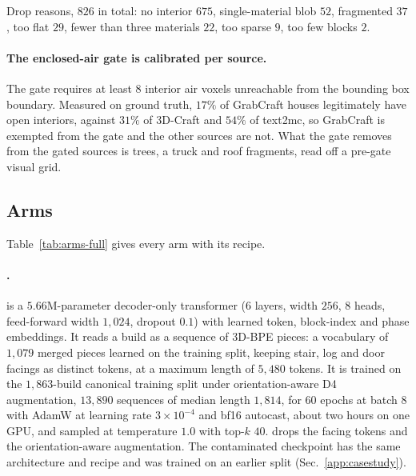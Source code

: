\begin{table}[h]
\centering
\small
\caption{Corpus construction, transcribed from the cache manifest. Per-source
columns are post-gate, post-deduplication counts and sum to \textbf{final}, which
is \emph{pooled} less quality drops less exact duplicates. Material variants, the
same shape in different materials, are \emph{kept}.}
\setlength{\tabcolsep}{3pt}
\end{table}

Drop reasons, $826$ in total: no interior $675$, single-material blob
$52$, fragmented $37$, too flat $29$, fewer than three materials $22$, too
sparse $9$, too few blocks $2$.

\paragraph{The enclosed-air gate is calibrated per source.}
The gate requires at least $8$ interior air voxels unreachable from the bounding
box boundary. Measured on ground truth, $17\%$ of GrabCraft houses legitimately
have open interiors, against $31\%$ of 3D-Craft and $54\%$ of text2mc, so
GrabCraft is exempted from the gate and the other sources are not. What the gate
removes from the gated sources is trees, a truck and roof fragments, read off a
pre-gate visual grid.

\subsection{Arms}

Table~\ref{tab:arms-full} gives every arm with its recipe.

\paragraph{\voxar{}.} \voxar{} is a $5.66$M-parameter decoder-only transformer
(6 layers, width $256$, $8$ heads, feed-forward width $1{,}024$, dropout $0.1$)
with learned token, block-index and phase embeddings. It reads a build as a
sequence of 3D-BPE pieces: a vocabulary of $1{,}079$ merged pieces learned on the
training split, keeping stair, log and door facings as distinct tokens, at a
maximum length of $5{,}480$ tokens. It is trained on the $1{,}863$-build canonical
training split under orientation-aware D4 augmentation, $13{,}890$ sequences of
median length $1{,}814$, for $60$ epochs at batch $8$ with AdamW at learning rate
$3\times10^{-4}$ and bf16 autocast, about two hours on one GPU, and sampled at
temperature $1.0$ with top-$k$ $40$. \voxarun{} drops the facing tokens and the
orientation-aware augmentation. The contaminated checkpoint has the same
architecture and recipe and was trained on an earlier split
(Sec.~\ref{app:casestudy}).

